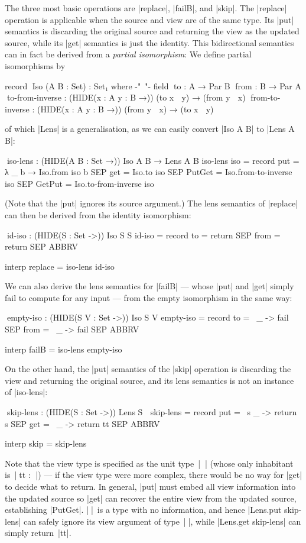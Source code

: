 \documentclass{sigplanconf}
\renewcommand{\emph}{\textsl}
\begin{document}
The three most basic operations are |replace|, |failB|, and |skip|.
The |replace| operation is applicable when the source and view are of the same type.
Its |put| semantics is discarding the original source and returning the view as the updated source, while its |get| semantics is just the identity.
This bidirectional semantics can in fact be derived from a \emph{partial isomorphism}:
We define partial isomorphisms by
\begin{code}
record ^^^Iso (A B : Set) : Set₁ where
{-"~"-}  field
           ^^^to    : A → Par B
           ^^^from  : B → Par A
           ^^^to-from-inverse  : (HIDE({x : A} {y : B} →)) (to x ↦ y) → (from y ↦ x)
           ^^^from-to-inverse  : (HIDE({x : A} {y : B} →)) (from y ↦ x) → (to x ↦ y)
\end{code}
of which |Lens| is a generalisation, as we can easily convert |Iso A B| to |Lens A B|:
\begin{code}
^^^iso-lens : (HIDE({A B : Set} →)) Iso A B → Lens A B
iso-lens iso = record  {    put     = λ _ b → Iso.from iso b
                       SEP  get     = Iso.to iso
                       SEP  PutGet  = Iso.from-to-inverse iso
                       SEP  GetPut  = Iso.to-from-inverse iso }
\end{code}
(Note that the |put| ignores its source argument.)
The lens semantics of |replace| can then be derived from the identity isomorphism:
\begin{code}
^^^id-iso : (HIDE({S : Set} ->)) Iso S S
id-iso = record  { to = return SEP from = return SEP ABBRV }

interp replace = iso-lens id-iso
\end{code}
We can also derive the lens semantics for |failB| --- whose |put| and |get| simply fail to compute for any input --- from the empty isomorphism in the same way:
\begin{code}
^^^empty-iso : (HIDE({S V : Set} ->)) Iso S V
empty-iso = record  {    to    = \ _ -> fail
                    SEP  from  = \ _ -> fail SEP ABBRV }

interp failB = iso-lens empty-iso
\end{code}
On the other hand, the |put| semantics of the |skip| operation is discarding the view and returning the original source, and its lens semantics is not an instance of |iso-lens|:
\begin{code}
^^^skip-lens : (HIDE({S : Set} ->)) Lens S ⊤
skip-lens = record  {    put  = \ s _ -> return s
                    SEP  get  = \ _ -> return tt SEP ABBRV }

interp skip = skip-lens
\end{code}
Note that the view type is specified as the unit type~|^^^⊤| (whose only inhabitant is~|^^^tt : ⊤|) --- if the view type were more complex, there would be no way for |get| to decide what to return.
In general, |put| must embed all view information into the updated source so |get| can recover the entire view from the updated source, establishing |PutGet|.
|⊤|~is a type with no information, and hence |Lens.put skip-lens| can safely ignore its view argument of type~|⊤|, while |Lens.get skip-lens| can simply return~|tt|.
\end{document}
